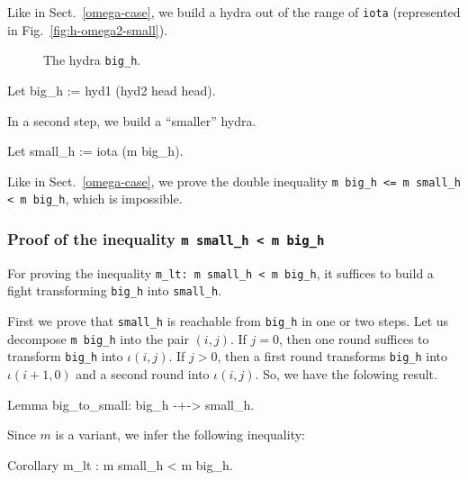 Like in Sect.~\ref{omega-case}, we build a hydra out of the range of \texttt{iota} (represented in Fig.~\vref{fig:h-omega2-small}).

\begin{figure}[htb]
\centering
{}
\caption{\label{fig:h-omega2-small}}
 The hydra \texttt{big\_h}.
\end{figure}
\begin{Coqsrc}
   Let big_h := hyd1 (hyd2 head head).  
 \end{Coqsrc}
 
 In a second step, we build a ``smaller'' hydra.
 
\begin{Coqsrc}
   Let small_h := iota (m big_h).
\end{Coqsrc}

Like in Sect.~\ref{omega-case}, we prove the double inequality \texttt{m big\_h <= m small\_h < m big\_h}, which is impossible.

\subsubsection{Proof of the inequality \texttt{m small\_h < m big\_h}}

For proving the inequality  \texttt{m\_lt: m small\_h < m big\_h}, it suffices to
build a fight transforming \texttt{big\_h} into \texttt{small\_h}.

First we prove that \texttt{small\_h} is reachable from \texttt{big\_h} in one or two steps. Let us decompose \texttt{m big\_h}
into the pair $(i,j)$.
If $j=0$, then one round suffices to transform \texttt{big\_h} into $\iota(i,j)$.
If $j>0$, then a first round transforms \texttt{big\_h} into $\iota(i+1,0)$ and a second round into $\iota(i,j)$. So, we have the folowing result.

\begin{Coqsrc}
 Lemma big_to_small: big_h -+-> small_h.
\end{Coqsrc}

Since $m$ is a variant, we infer the following inequality:

\begin{Coqsrc}
Corollary m_lt : m small_h < m big_h.
\end{Coqsrc}


